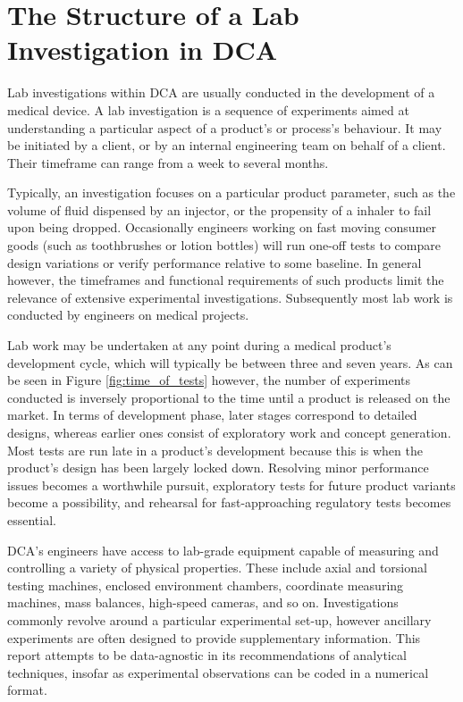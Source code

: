 \documentclass[11pt,a4paper,article]{memoir} %
\newlength\drop
\begin{document}
\section{The Structure of a Lab Investigation in DCA}
 Lab investigations within DCA are usually conducted in the development of a medical device. A lab investigation is a sequence of experiments aimed at understanding a particular aspect of a product's or process's behaviour. It may be initiated by a client, or by an internal engineering team on behalf of a client. Their timeframe can range from a week to several months.
 \par
 Typically, an investigation focuses on a particular product parameter, such as the volume of fluid dispensed by an injector, or the propensity of a inhaler to fail upon being dropped. Occasionally engineers working on fast moving consumer goods (such as toothbrushes or lotion bottles) will run one-off tests to compare design variations or verify performance relative to some baseline. In general however, the timeframes and functional requirements of such products limit the relevance of extensive experimental investigations. Subsequently most lab work is conducted by engineers on medical projects.
\par
Lab work may be undertaken at any point during a medical product's development cycle, which will typically be between three and seven years. As can be seen in Figure \ref{fig:time_of_tests} however, the number of experiments conducted is inversely proportional to the time until a product is released on the market. In terms of development phase, later stages correspond to detailed designs, whereas earlier ones consist of exploratory work and concept generation. Most tests are run late in a product's development because this is when the product's design has been largely locked down. Resolving minor performance issues becomes a worthwhile pursuit, exploratory tests for future product variants become a possibility, and rehearsal for fast-approaching regulatory tests becomes essential.
\par
DCA's engineers have access to lab-grade equipment capable of measuring and controlling a variety of physical properties. These include axial and torsional testing machines, enclosed environment chambers, coordinate measuring machines, mass balances, high-speed cameras, and so on. Investigations commonly revolve around a particular experimental set-up, however ancillary experiments are often designed to provide supplementary information. This report attempts to be data-agnostic in its recommendations of analytical techniques, insofar as experimental observations can be coded in a numerical format.
\par
\end{document}
